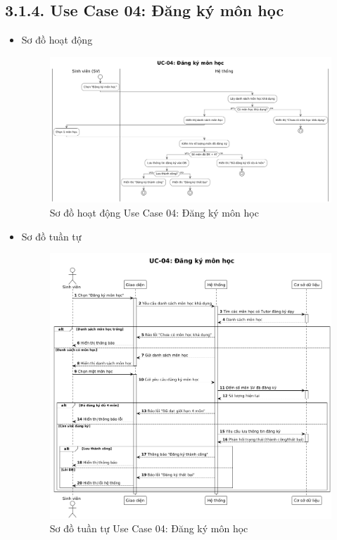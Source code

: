 \subsection*{3.1.4. Use Case 04: Đăng ký môn học}
\begin{itemize}
    \item Sơ đồ hoạt động
    \begin{figure}[H]
    \centering
    \includegraphics[scale=0.35 ]{Picture/ACUC04.png}
    \caption{Sơ đồ hoạt động Use Case 04: Đăng ký môn học}
    \end{figure}
    \item Sơ đồ tuần tự
    \begin{figure}[H]
    \centering
    \includegraphics[scale=0.35 ]{Picture/SEUC04.png}
    \caption{Sơ đồ tuần tự Use Case 04: Đăng ký môn học}
    \end{figure}
\end{itemize}
